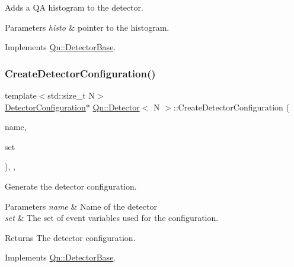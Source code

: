 Adds a QA histogram to the detector. 


\begin{DoxyParams}{Parameters}
{\em histo} & pointer to the histogram. \\
\hline
\end{DoxyParams}


Implements \mbox{\hyperlink{classQn_1_1DetectorBase}{Qn\+::\+Detector\+Base}}.

\mbox{\label{classQn_1_1Detector_abf5ba68165d2e037b7c21911230ed288}} 
\subsubsection{\texorpdfstring{Create\+Detector\+Configuration()}{CreateDetectorConfiguration()}}
{\footnotesize\ttfamily template$<$std\+::size\+\_\+t N$>$ \\
\mbox{\hyperlink{classQn_1_1DetectorConfiguration}{Detector\+Configuration}}$\ast$ \mbox{\hyperlink{classQn_1_1Detector}{Qn\+::\+Detector}}$<$ N $>$\+::Create\+Detector\+Configuration (\begin{DoxyParamCaption}\item[{const std\+::string \&}]{name,  }\item[{\mbox{\hyperlink{classQn_1_1EventClassVariablesSet}{Event\+Class\+Variables\+Set}} $\ast$}]{set }\end{DoxyParamCaption})\hspace{0.3cm}{\ttfamily [inline]}, {\ttfamily [override]}, {\ttfamily [virtual]}}

Generate the detector configuration. 
\begin{DoxyParams}{Parameters}
{\em name} & Name of the detector \\
\hline
{\em set} & The set of event variables used for the configuration. \\
\hline
\end{DoxyParams}
\begin{DoxyReturn}{Returns}
The detector configuration. 
\end{DoxyReturn}


Implements \mbox{\hyperlink{classQn_1_1DetectorBase}{Qn\+::\+Detector\+Base}}.

\mbox{\label{classQn_1_1Detector_a383267252d65877fa80fa7a0416e95bf}} 
